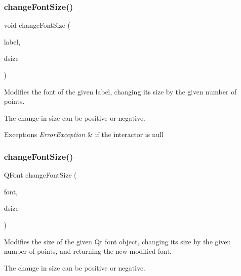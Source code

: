 \subsubsection{\texorpdfstring{change\+Font\+Size()}{changeFontSize()}\hspace{0.1cm}{\footnotesize\ttfamily [2/3]}}
{\footnotesize\ttfamily void change\+Font\+Size (\begin{DoxyParamCaption}\item[{\mbox{\hyperlink{classsgl_1_1GText}{G\+Text}} $\ast$}]{label,  }\item[{int}]{dsize }\end{DoxyParamCaption})\hspace{0.3cm}{\ttfamily [static]}}



Modifies the font of the given label, changing its size by the given number of points. 

The change in size can be positive or negative. 
\begin{DoxyExceptions}{Exceptions}
{\em Error\+Exception} & if the interactor is null \\
\hline
\end{DoxyExceptions}
\mbox{\label{classsgl_1_1GFont_a1f55c64940d99e62528d5bfc634123f8}} 
\subsubsection{\texorpdfstring{change\+Font\+Size()}{changeFontSize()}\hspace{0.1cm}{\footnotesize\ttfamily [3/3]}}
{\footnotesize\ttfamily Q\+Font change\+Font\+Size (\begin{DoxyParamCaption}\item[{const Q\+Font \&}]{font,  }\item[{int}]{dsize }\end{DoxyParamCaption})\hspace{0.3cm}{\ttfamily [static]}}



Modifies the size of the given Qt font object, changing its size by the given number of points, and returning the new modified font. 

The change in size can be positive or negative. \mbox{\label{classsgl_1_1GFont_ac36fbf8f4ebf4558559f98d54277529f}} 

